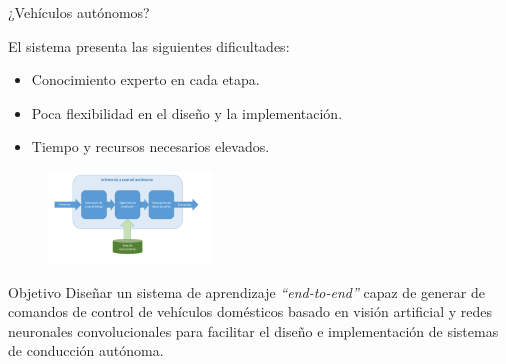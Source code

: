 \documentclass[10pt]{beamer}
\begin{document}
\begin{frame}[fragile]{¿Vehículos autónomos?}

    El sistema presenta las siguientes dificultades:
    \begin{itemize}
        \item \alert{Conocimiento experto} en cada etapa.
        \item \alert{Poca flexibilidad} en el diseño y la implementación.
        \item \alert{Tiempo y recursos} necesarios elevados.
    \end{itemize}
    \begin{figure}[!h] 
      \centering
      \includegraphics[width=0.39\textwidth]{../img/inferencia}
      \end{figure}
  
  \end{frame}

\begin{frame}{Objetivo}
    Diseñar un sistema de aprendizaje \emph{“end-to-end”} capaz de generar de comandos de 
control de vehículos domésticos basado en visión artificial y \alert{redes neuronales 
convolucionales} para facilitar el diseño e implementación de sistemas de conducción autónoma.
\end{frame}


    
\end{document}
